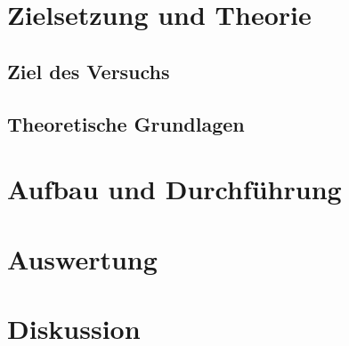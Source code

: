 





\maketitle
\thispagestyle{empty}
\tableofcontents
\newpage

\section{Zielsetzung und Theorie}

\subsection{Ziel des Versuchs}


\subsection{Theoretische Grundlagen}


\section{Aufbau und Durchführung}


% 

\section{Auswertung}


\section{Diskussion}


\newpage
\nocite{*}
\printbibliography


